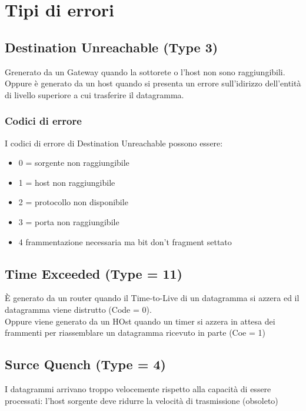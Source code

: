 \documentclass{report}
\begin{document}
        \section{Tipi di errori}
            \subsection{Destination Unreachable (Type 3)}
                Grenerato da un Gateway quando la sottorete o l'host non sono raggiungibili.
                \\
                Oppure è generato da un host quando si presenta un errore sull'idirizzo dell'entità di livello superiore a cui trasferire il datagramma.
                \subsubsection{Codici di errore}
                    I codici di errore di Destination Unreachable possono essere:
                    \begin{itemize}
                        \item 0 = sorgente non raggiungibile
                        \item 1 = host non raggiungibile
                        \item 2 = protocollo non disponibile 
                        \item 3 = porta non raggiungibile 
                        \item 4 frammentazione necessaria ma bit don't fragment settato
                    \end{itemize}
            \subsection{Time Exceeded (Type = 11)}
                È generato da un router quando il Time-to-Live di un datagramma si azzera ed il datagramma viene distrutto (Code = 0).
                \\
                Oppure viene generato da un HOst quando un timer si azzera in attesa dei frammenti per riassemblare un datagramma ricevuto in parte (Coe = 1)
            \subsection{Surce Quench (Type = 4)}
                I datagrammi arrivano troppo velocemente rispetto alla capacità di essere processati: l'host sorgente deve ridurre la velocità di trasmissione (obsoleto)
\end{document}
